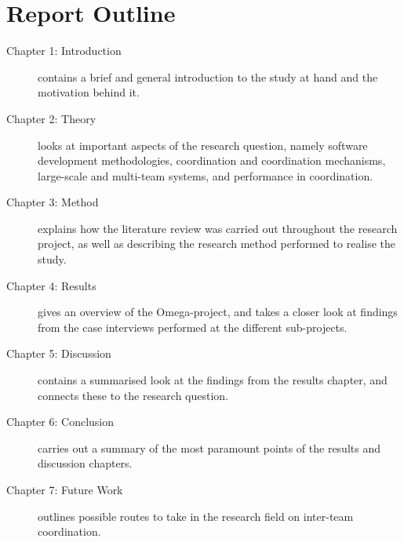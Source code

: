 \newpage

\section{Report Outline}

\begin{description}
    \item[Chapter 1: Introduction] contains a brief and general introduction to the study at hand and the motivation behind it.
    \item[Chapter 2: Theory] looks at important aspects of the research question, namely software development methodologies, coordination and coordination mechanisms, large-scale and multi-team systems, and performance in coordination.
    \item[Chapter 3: Method] explains how the literature review was carried out throughout the research project, as well as describing the research method performed to realise the study.
    \item[Chapter 4: Results] gives an overview of the Omega-project, and takes a closer look at findings from the case interviews performed at the different sub-projects.
    \item[Chapter 5: Discussion] contains a summarised look at the findings from the results chapter, and connects these to the research question.
    \item[Chapter 6: Conclusion] carries out a summary of the most paramount points of the results and discussion chapters.
    \item[Chapter 7: Future Work] outlines possible routes to take in the research field on inter-team coordination.
\end{description}